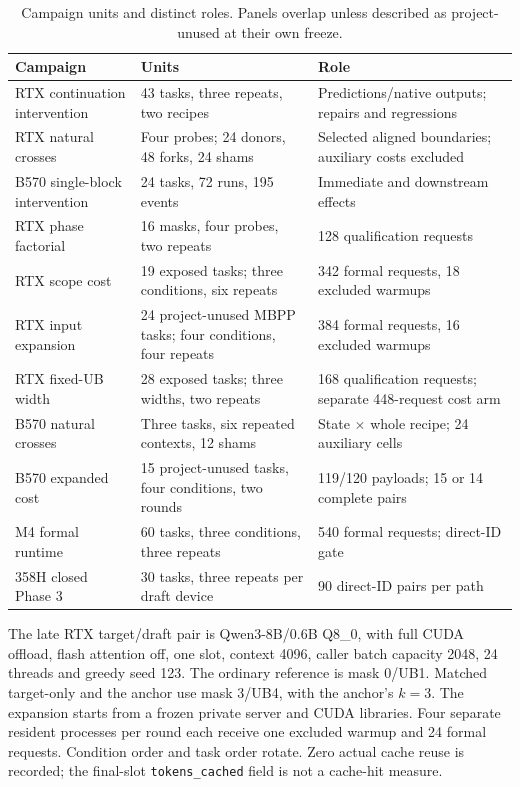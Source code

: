 \begin{table}[ht]\centering\small
\caption{Campaign units and distinct roles. Panels overlap unless described as project-unused at their own freeze.}
\label{tab:study_units}
\begin{tabularx}{\linewidth}{@{}p{.30\linewidth}p{.25\linewidth}X@{}}\toprule
Campaign & Units & Role\\\midrule
RTX continuation intervention & 43 tasks, three repeats, two recipes & Predictions/native outputs; repairs and regressions\\
RTX natural crosses & Four probes; 24 donors, 48 forks, 24 shams & Selected aligned boundaries; auxiliary costs excluded\\
B570 single-block intervention & 24 tasks, 72 runs, 195 events & Immediate and downstream effects\\
RTX phase factorial & 16 masks, four probes, two repeats & 128 qualification requests\\
RTX scope cost & 19 exposed tasks; three conditions, six repeats & 342 formal requests, 18 excluded warmups\\
RTX input expansion & 24 project-unused MBPP tasks; four conditions, four repeats & 384 formal requests, 16 excluded warmups\\
RTX fixed-UB width & 28 exposed tasks; three widths, two repeats & 168 qualification requests; separate 448-request cost arm\\
B570 natural crosses & Three tasks, six repeated contexts, 12 shams & State $\times$ whole recipe; 24 auxiliary cells\\
B570 expanded cost & 15 project-unused tasks, four conditions, two rounds & 119/120 payloads; 15 or 14 complete pairs\\
M4 formal runtime & 60 tasks, three conditions, three repeats & 540 formal requests; direct-ID gate\\
358H closed Phase 3 & 30 tasks, three repeats per draft device & 90 direct-ID pairs per path\\\bottomrule
\end{tabularx}
\end{table}

The late RTX target/draft pair is Qwen3-8B/0.6B Q8\_0, with full CUDA offload, flash attention off, one slot, context 4096, caller batch capacity 2048, 24 threads and greedy seed 123. The ordinary reference is mask 0/UB1. Matched target-only and the anchor use mask 3/UB4, with the anchor's $k=3$. The expansion starts from a frozen private server and CUDA libraries. Four separate resident processes per round each receive one excluded warmup and 24 formal requests. Condition order and task order rotate. Zero actual cache reuse is recorded; the final-slot \texttt{tokens\_cached} field is not a cache-hit measure.

